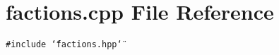 \section{factions.cpp File Reference}
\label{factions_8cpp}
{\tt \#include \char`\"{}factions.hpp\char`\"{}}\par
